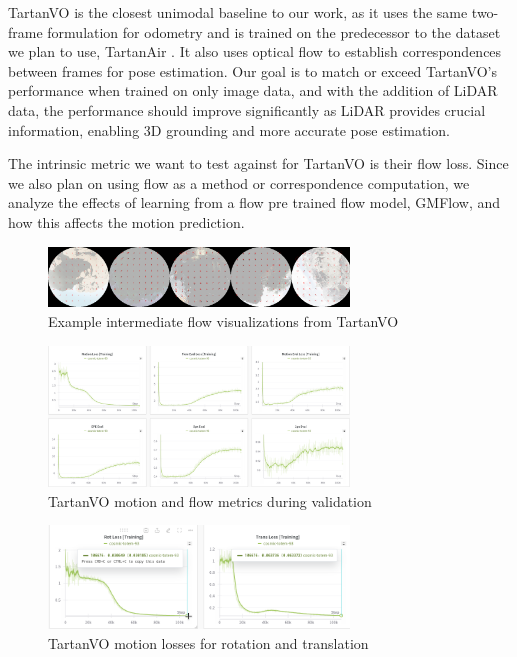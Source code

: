 \documentclass[11pt,a4paper]{article}
\begin{document}
TartanVO \cite{tartanvo} is the closest unimodal baseline to our work, as it uses the same two-frame formulation for odometry and is trained on the predecessor to the dataset we plan to use, TartanAir \cite{tartanair}. It also uses optical flow to establish correspondences between frames for pose estimation. Our goal is to match or exceed TartanVO’s performance when trained on only image data, and with the addition of LiDAR data, the performance should improve significantly as LiDAR provides crucial information, enabling 3D grounding and more accurate pose estimation.

The intrinsic metric we want to test against for TartanVO is their flow loss. Since we also plan on using flow as a method or correspondence computation, we analyze the effects of learning from a flow pre trained flow model, GMFlow, and how this affects the motion prediction.

\begin{figure}[htbp]
    \centering
    \includegraphics[width=8cm]{Reports/3-Analysis-of-Baselines/images/tartanvo/flow_img.png}
    \caption{Example intermediate flow visualizations from TartanVO}
    \label{fig:tvo-flow-img}
\end{figure}

\begin{figure}[htbp]
    \centering
    \includegraphics[width=8cm]{Reports/3-Analysis-of-Baselines/images/tartanvo/flow_loss.png}
    \caption{TartanVO motion and flow metrics during validation}
    \label{fig:tvo-flow-loss}
\end{figure}

\begin{figure}[htbp]
    \centering
    \includegraphics[width=8cm]{Reports/3-Analysis-of-Baselines/images/tartanvo/rot_trans_loss.png}
    \caption{TartanVO motion losses for rotation and translation}
    \label{fig:tvo-rot-trans}
\end{figure}
\end{document}
